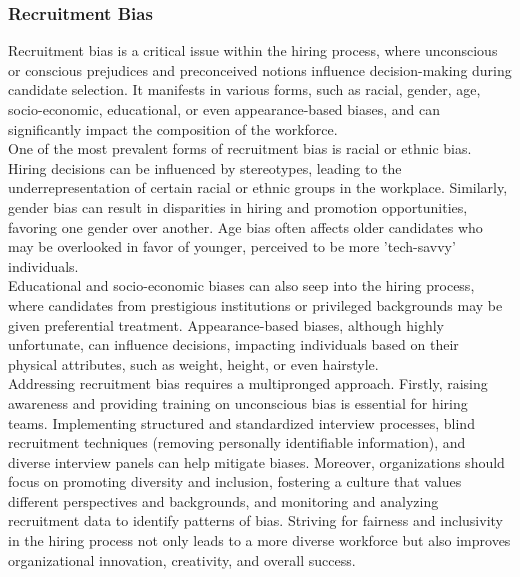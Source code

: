 \documentclass[12pt,a4paper,openright,twoside]{book}
\begin{document}
\subsubsection{Recruitment Bias}
Recruitment bias is a critical issue within the hiring process, where unconscious or conscious prejudices and preconceived notions influence decision-making during candidate selection. It manifests in various forms, such as racial, gender, age, socio-economic, educational, or even appearance-based biases, and can significantly impact the composition of the workforce. \cite{mujtaba2019ethical} \\
One of the most prevalent forms of recruitment bias is racial or ethnic bias. Hiring decisions can be influenced by stereotypes, leading to the underrepresentation of certain racial or ethnic groups in the workplace. Similarly, gender bias can result in disparities in hiring and promotion opportunities, favoring one gender over another. Age bias often affects older candidates who may be overlooked in favor of younger, perceived to be more 'tech-savvy' individuals. \\
Educational and socio-economic biases can also seep into the hiring process, where candidates from prestigious institutions or privileged backgrounds may be given preferential treatment. Appearance-based biases, although highly unfortunate, can influence decisions, impacting individuals based on their physical attributes, such as weight, height, or even hairstyle. \\
Addressing recruitment bias requires a multipronged approach. Firstly, raising awareness and providing training on unconscious bias is essential for hiring teams. Implementing structured and standardized interview processes, blind recruitment techniques (removing personally identifiable information), and diverse interview panels can help mitigate biases. Moreover, organizations should focus on promoting diversity and inclusion, fostering a culture that values different perspectives and backgrounds, and monitoring and analyzing recruitment data to identify patterns of bias. Striving for fairness and inclusivity in the hiring process not only leads to a more diverse workforce but also improves organizational innovation, creativity, and overall success.
\newpage
\end{document}
